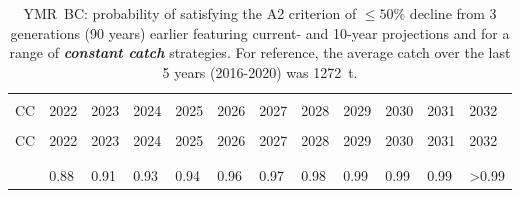 \documentclass[11pt]{book}
\newcommand{\itbf}[1]{\textit{\textbf{#1}}}
\begin{document}
\begin{longtable}[c]{>{\raggedright\let\newline\\\arraybackslash\hspace{0pt}}p{0.49in}>{\raggedleft\let\newline\\\arraybackslash\hspace{0pt}}p{0.49in}>{\raggedleft\let\newline\\\arraybackslash\hspace{0pt}}p{0.49in}>{\raggedleft\let\newline\\\arraybackslash\hspace{0pt}}p{0.49in}>{\raggedleft\let\newline\\\arraybackslash\hspace{0pt}}p{0.49in}>{\raggedleft\let\newline\\\arraybackslash\hspace{0pt}}p{0.49in}>{\raggedleft\let\newline\\\arraybackslash\hspace{0pt}}p{0.49in}>{\raggedleft\let\newline\\\arraybackslash\hspace{0pt}}p{0.49in}>{\raggedleft\let\newline\\\arraybackslash\hspace{0pt}}p{0.49in}>{\raggedleft\let\newline\\\arraybackslash\hspace{0pt}}p{0.49in}>{\raggedleft\let\newline\\\arraybackslash\hspace{0pt}}p{0.49in}>{\raggedleft\let\newline\\\arraybackslash\hspace{0pt}}p{0.6in}}
  \caption{YMR~BC: probability of satisfying the A2 criterion of $\leq 50 \%$ decline from 3 generations (90 years) earlier featuring current- and 10-year projections and for a range of \itbf{constant catch} strategies.  For reference, the average catch over the last 5 years (2016-2020) was 1272~t. } \label{tab:ymr.cosewic.50Gen.CCs}\\  \hline\\[-2.2ex]  CC  & 2022 & 2023 & 2024 & 2025 & 2026 & 2027 & 2028 & 2029 & 2030 & 2031 & 2032 \\[0.2ex]\hline\\[-1.5ex]  \endfirsthead   \hline  CC  & 2022 & 2023 & 2024 & 2025 & 2026 & 2027 & 2028 & 2029 & 2030 & 2031 & 2032 \\[0.2ex]\hline\\[-1.5ex]  \endhead  \hline\\[-2.2ex]   \endfoot  \hline \endlastfoot  0 & 0.88 & 0.91 & 0.93 & 0.94 & 0.96 & 0.97 & 0.98 & 0.99 & 0.99 & 0.99 & >0.99 \\ 

\end{longtable}
\end{document}
